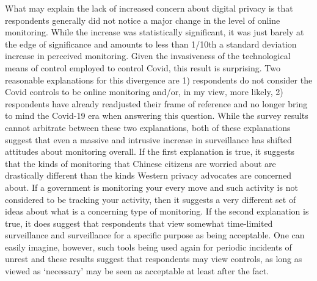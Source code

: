 \documentclass[
  letterpaper,
  DIV=11,
  numbers=noendperiod]{scrartcl}
\begin{document}
What may explain the lack of increased concern about digital privacy is
that respondents generally did not notice a major change in the level of
online monitoring. While the increase was statistically significant, it
was just barely at the edge of significance and amounts to less than
1/10th a standard deviation increase in perceived monitoring. Given the
invasiveness of the technological means of control employed to control
Covid, this result is surprising. Two reasonable explanations for this
divergence are 1) respondents do not consider the Covid controls to be
online monitoring and/or, in my view, more likely, 2) respondents have
already readjusted their frame of reference and no longer bring to mind
the Covid-19 era when answering this question. While the survey results
cannot arbitrate between these two explanations, both of these
explanations suggest that even a massive and intrusive increase in
surveillance has shifted attitudes about monitoring overall. If the
first explanation is true, it suggests that the kinds of monitoring that
Chinese citizens are worried about are drastically different than the
kinds Western privacy advocates are concerned about. If a government is
monitoring your every move and such activity is not considered to be
tracking your activity, then it suggests a very different set of ideas
about what is a concerning type of monitoring. If the second explanation
is true, it does suggest that respondents that view somewhat
time-limited surveillance and surveillance for a specific purpose as
being acceptable. One can easily imagine, however, such tools being used
again for periodic incidents of unrest and these results suggest that
respondents may view controls, as long as viewed as `necessary' may be
seen as acceptable at least after the fact.
\end{document}
